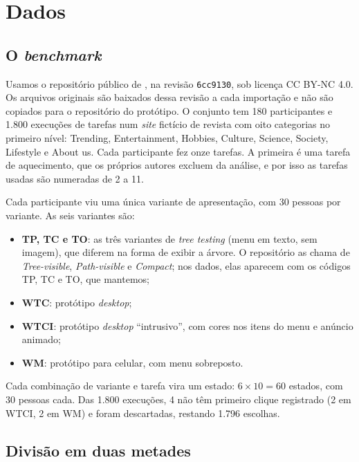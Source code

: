 \documentclass[12pt,oneside,a4paper,chapter=TITLE,english,brazil]{abntex2}
\newcommand{\code}[1]{\texttt{#1}}
\begin{document}
\section{Dados}
\label{sec:dados}

\subsection{O \textit{benchmark}}

Usamos o repositório público de , na revisão \code{6cc9130}, sob licença CC BY-NC 4.0. Os arquivos originais são baixados dessa revisão a cada importação e não são copiados para o repositório do protótipo. O conjunto tem 180 participantes e 1.800 execuções de tarefas num \textit{site} fictício de revista com oito categorias no primeiro nível: Trending, Entertainment, Hobbies, Culture, Science, Society, Lifestyle e About us. Cada participante fez onze tarefas. A primeira é uma tarefa de aquecimento, que os próprios autores excluem da análise, e por isso as tarefas usadas são numeradas de 2 a 11.

Cada participante viu uma única variante de apresentação, com 30 pessoas por variante. As seis variantes são:

\begin{itemize}
\item \textbf{TP, TC e TO}: as três variantes de \textit{tree testing} (menu em texto, sem imagem), que diferem na forma de exibir a árvore. O repositório as chama de \textit{Tree-visible}, \textit{Path-visible} e \textit{Compact}; nos dados, elas aparecem com os códigos TP, TC e TO, que mantemos;
\item \textbf{WTC}: protótipo \textit{desktop};
\item \textbf{WTCI}: protótipo \textit{desktop} ``intrusivo'', com cores nos itens do menu e anúncio animado;
\item \textbf{WM}: protótipo para celular, com menu sobreposto.
\end{itemize}

Cada combinação de variante e tarefa vira um estado: $6\times10=60$ estados, com 30 pessoas cada. Das 1.800 execuções, 4 não têm primeiro clique registrado (2 em WTCI, 2 em WM) e foram descartadas, restando 1.796 escolhas.

\subsection{Divisão em duas metades}
\end{document}
